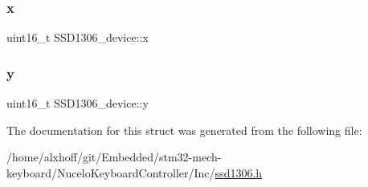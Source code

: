 \mbox{\label{structSSD1306__device_abbf07db1d4d5f7c247b2a3ef539adbcf}} 
\subsubsection{\texorpdfstring{x}{x}}
{\footnotesize\ttfamily uint16\+\_\+t S\+S\+D1306\+\_\+device\+::x}

\mbox{\label{structSSD1306__device_a696e3c8355fd319fc25fa4f711e496df}} 
\subsubsection{\texorpdfstring{y}{y}}
{\footnotesize\ttfamily uint16\+\_\+t S\+S\+D1306\+\_\+device\+::y}



The documentation for this struct was generated from the following file\+:\begin{DoxyCompactItemize}
\item 
/home/alxhoff/git/\+Embedded/stm32-\/mech-\/keyboard/\+Nucelo\+Keyboard\+Controller/\+Inc/\hyperlink{ssd1306_8h}{ssd1306.\+h}\end{DoxyCompactItemize}
